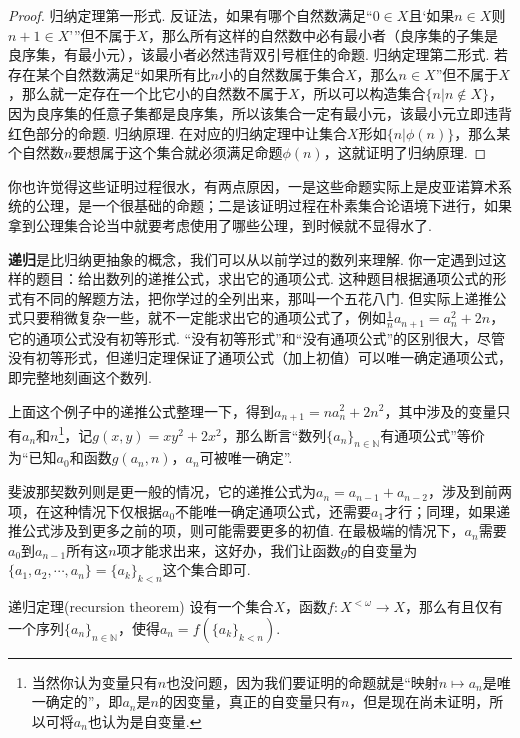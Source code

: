 \begin{proof}
    归纳定理第一形式. 反证法，如果有哪个自然数满足“\(0 \in X\)且‘如果\(n \in X\)则\(n+1 \in X\)’”但不属于\(X\)，那么所有这样的自然数中必有最小者（良序集的子集是良序集，有最小元），该最小者必然违背双引号框住的命题. \newline
    归纳定理第二形式. 若存在某个自然数满足“如果所有比\(n\)小的自然数属于集合\(X\)，那么\(n \in X\)”但不属于\(X\)，那么就一定存在一个比它小的自然数不属于\(X\)，所以可以构造集合\(\{n | n \not \in X\}\)，因为良序集的任意子集都是良序集，所以该集合一定有最小元，该最小元立即违背红色部分的命题. \newline
    归纳原理. 在对应的归纳定理中让集合\(X\)形如\(\{n|\phi(n)\}\)，那么某个自然数\(n\)要想属于这个集合就必须满足命题\(\phi(n)\)，这就证明了归纳原理.
\end{proof}

你也许觉得这些证明过程很水，有两点原因，一是这些命题实际上是皮亚诺算术系统的公理，是一个很基础的命题；二是该证明过程在朴素集合论语境下进行，如果拿到公理集合论当中就要考虑使用了哪些公理，到时候就不显得水了. 

\textbf{递归}是比归纳更抽象的概念，我们可以从以前学过的数列来理解. 你一定遇到过这样的题目：给出数列的递推公式，求出它的通项公式. 这种题目根据通项公式的形式有不同的解题方法，把你学过的全列出来，那叫一个五花八门. 但实际上递推公式只要稍微复杂一些，就不一定能求出它的通项公式了，例如\(\frac{1}{n}a_{n+1}=a_n^2+2n\)，它的通项公式没有初等形式. “没有初等形式”和“没有通项公式”的区别很大，尽管没有初等形式，但递归定理保证了通项公式（加上初值）可以唯一确定通项公式，即完整地刻画这个数列.

上面这个例子中的递推公式整理一下，得到\(a_{n+1}=na_n^2+2n^2\)，其中涉及的变量只有\(a_n\)和\(n\)\footnote{当然你认为变量只有\(n\)也没问题，因为我们要证明的命题就是“映射\(n \mapsto a_n\)是唯一确定的”，即\(a_n\)是\(n\)的因变量，真正的自变量只有\(n\)，但是现在尚未证明，所以可将\(a_n\)也认为是自变量.}，记\(g(x,y)=xy^2+2x^2\)，那么断言“数列\(\{a_n\}_{n \in \mathbb{N}}\)有通项公式”等价为“已知\(a_0\)和函数\(g(a_n,n)\)，\(a_n\)可被唯一确定”.

斐波那契数列则是更一般的情况，它的递推公式为\(a_n=a_{n-1}+a_{n-2}\)，涉及到前两项，在这种情况下仅根据\(a_0\)不能唯一确定通项公式，还需要\(a_1\)才行；同理，如果递推公式涉及到更多之前的项，则可能需要更多的初值. 在最极端的情况下，\(a_n\)需要\(a_0\)到\(a_{n-1}\)所有这\(n\)项才能求出来，这好办，我们让函数\(g\)的自变量为\(\{a_1,a_2,\cdots,a_n\}=\{a_k\}_{k<n}\)这个集合即可.

\begin{theorem}{递归定理(recursion theorem)}
    设有一个集合\(X\)，函数\(f: X^{<\omega} \to X\)，那么有且仅有一个序列\(\{a_n\}_{n \in \mathbb{N}}\)，使得\(a_n = f(\{a_k\}_{k < n})\).
\end{theorem}


